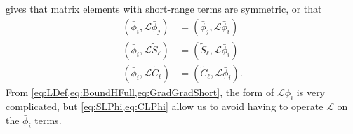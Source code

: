 \documentclass[Dissertation.tex]{subfiles}
\begin{document}
gives that matrix elements with short-range terms are symmetric, or that
\begin{subequations}
\label{eq:ShortElemSymm}
\begin{align}
\left(\bar{\phi}_i, \mathcal{L} \bar{\phi}_j \right) &= \left(\bar{\phi}_j, \mathcal{L} \bar{\phi}_i \right) \\
\left(\bar{\phi}_i, \mathcal{L} \widetilde{S}_\ell \right) &= \left(\widetilde{S}_\ell, \mathcal{L} \bar{\phi}_i \right) \label{eq:SLPhi} \\
\left(\bar{\phi}_i, \mathcal{L} \widetilde{C}_\ell \right) &= \left(\widetilde{C}_\ell, \mathcal{L} \bar{\phi}_i \right) \label{eq:CLPhi}.
\end{align}
\end{subequations}
From \cref{eq:LDef,eq:BoundHFull,eq:GradGradShort}, the form of $\mathcal{L}\phi_i$ is very complicated, but \cref{eq:SLPhi,eq:CLPhi} allow us to avoid having to operate $\mathcal{L}$ on the $\bar{\phi}_i$ terms.
\end{document}
